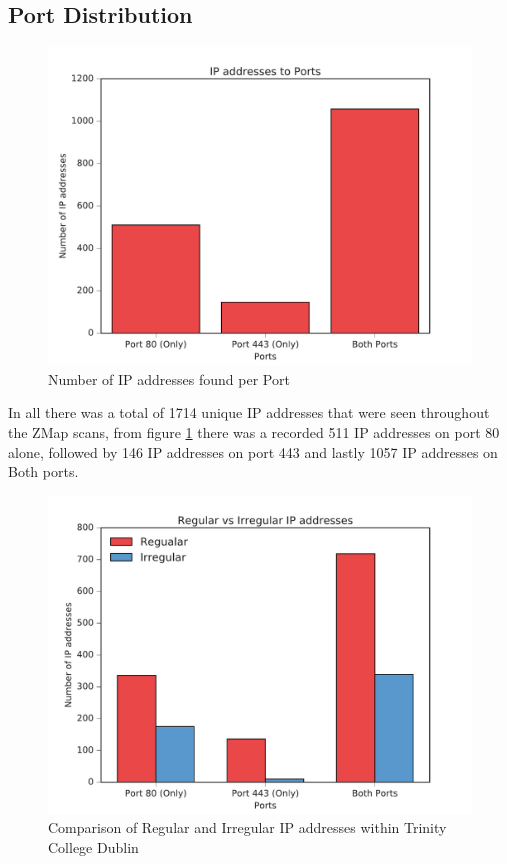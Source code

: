 \documentclass[a4wide,leqno,12pt]{report}
\begin{document}
\subsection{Port Distribution}
\begin{figure}[H]
\centering
\includegraphics[scale=.5]{pdf_images/IPaddressestoPorts}
\caption{Number of IP addresses found per Port}
\label{fig:ports}
\end{figure}
In all there was a total of 1714 unique IP addresses that were seen throughout the ZMap scans, from figure \ref{fig:ports} there was a recorded 511 IP addresses on port 80 alone, followed by 146 IP addresses on port 443 and lastly 1057 IP addresses on Both ports.

\begin{figure}[H]
\centering
\includegraphics[scale=.5]{pdf_images/RegularVsIrregularIPaddresses}
\caption{Comparison of Regular and Irregular IP addresses within Trinity College Dublin}
\label{fig:portsIrreg}
\end{figure}
\end{document}
